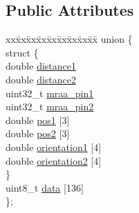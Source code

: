 \subsection*{Public Attributes}
\begin{DoxyCompactItemize}
\item 
\begin{tabbing}
xx\=xx\=xx\=xx\=xx\=xx\=xx\=xx\=xx\=\kill
union \{\\
\>struct \{\\
\>\>double \hyperlink{structpulsed__light__message_a978465139ddc4eaef1cf0bf5c87aa095}{distance1}\\
\>\>double \hyperlink{structpulsed__light__message_a5b2b73eea673eb1ba7c7793bb90d89d6}{distance2}\\
\>\>uint32\_t \hyperlink{structpulsed__light__message_aed1414064822ca15f33ab72b64b98a7d}{mraa\_pin1}\\
\>\>uint32\_t \hyperlink{structpulsed__light__message_aa36ddffc56849ff69e4cc17084f9635d}{mraa\_pin2}\\
\>\>double \hyperlink{structpulsed__light__message_ade8c428c9e6d99625033f3b0d74f96ad}{pos1} \mbox{[}3\mbox{]}\\
\>\>double \hyperlink{structpulsed__light__message_a598e2ddd86da341b3703b9a1e6a81d27}{pos2} \mbox{[}3\mbox{]}\\
\>\>double \hyperlink{structpulsed__light__message_aa50c043648567a006240ad6c39766898}{orientation1} \mbox{[}4\mbox{]}\\
\>\>double \hyperlink{structpulsed__light__message_a26ad20b42bc70bdf6299b4f69c8f3c91}{orientation2} \mbox{[}4\mbox{]}\\
\>\} \\
\>uint8\_t \hyperlink{structpulsed__light__message_a4598eab79d2487a7bdb3d1aa64a10e6f}{data} \mbox{[}136\mbox{]}\\
\}; \\

\end{tabbing}\end{DoxyCompactItemize}



